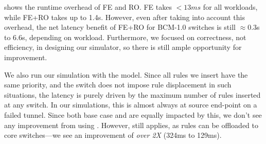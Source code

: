  shows the runtime overhead of FE and RO. FE takes $<13ms$ for
all workloads, while FE+RO takes up to 1.4s. However, even after taking into
account this overhead, the net latency benefit of FE+RO for BCM-1.0 switches is still
$\approx$0.3s to 6.6s, depending on workload. Furthermore, we focused on
correctness, not efficiency, in designing our simulator, so there is still
ample opportunity for improvement.
    



We also run our simulation with the \Intel model. Since all rules we insert
have the same priority, and the \Intel switch does not impose rule
displacement in such situations, the latency is purely driven by the maximum
number of rules inserted at any switch. In our simulations, this is almost
always at source end-point on a failed tunnel. Since both base case and \FE
are equally impacted by this, we don't see any improvement from using \FE.
However, \RO still applies, as rules can be offloaded to core switches---we
see an improvement of {\em over 2X} (324ms to 129ms).


 



